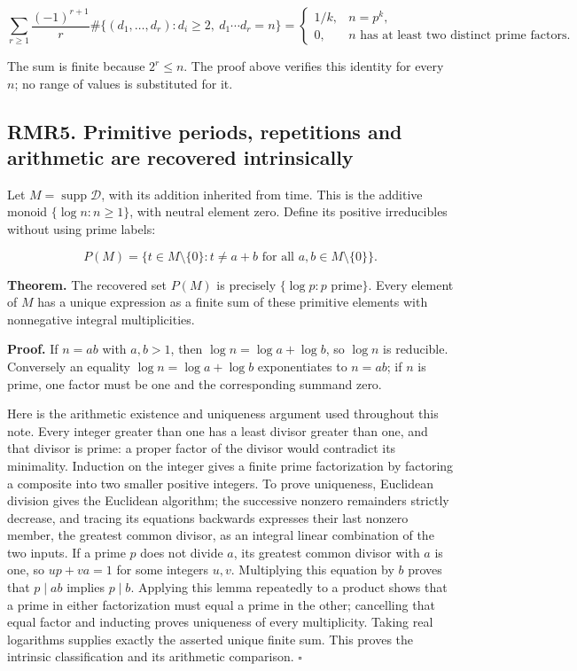 \[
\sum_{r\ge1}\frac{(-1)^{r+1}}r
\#\{(d_1,\ldots,d_r):d_i\ge2,\ d_1\cdots d_r=n\}
=\begin{cases}1/k,&n=p^k,\\0,&n\text{ has at least two distinct prime factors.}\end{cases}
\tag{RMR4.5}
\]

The sum is finite because \(2^r\le n\). The proof above verifies this
identity for every \(n\); no range of values is substituted for it.

\subsection{RMR5. Primitive periods, repetitions and arithmetic are
recovered
intrinsically}\label{rmr5.-primitive-periods-repetitions-and-arithmetic-are-recovered-intrinsically}

Let \(M=\operatorname{supp}\mathcal D\), with its addition inherited
from time. This is the additive monoid \(\{\log n:n\ge1\}\), with
neutral element zero. Define its positive irreducibles without using
prime labels:

\[
P(M)=\{t\in M\setminus\{0\}:t\ne a+b\text{ for all }a,b\in M\setminus\{0\}\}.
\tag{RMR5.1}
\]

\textbf{Theorem.} The recovered set \(P(M)\) is precisely
\(\{\log p:p\text{ prime}\}\). Every element of \(M\) has a unique
expression as a finite sum of these primitive elements with nonnegative
integral multiplicities.

\textbf{Proof.} If \(n=ab\) with \(a,b>1\), then
\(\log n=\log a+\log b\), so \(\log n\) is reducible. Conversely an
equality \(\log n=\log a+\log b\) exponentiates to \(n=ab\); if \(n\) is
prime, one factor must be one and the corresponding summand zero.

Here is the arithmetic existence and uniqueness argument used throughout
this note. Every integer greater than one has a least divisor greater
than one, and that divisor is prime: a proper factor of the divisor
would contradict its minimality. Induction on the integer gives a finite
prime factorization by factoring a composite into two smaller positive
integers. To prove uniqueness, Euclidean division gives the Euclidean
algorithm; the successive nonzero remainders strictly decrease, and
tracing its equations backwards expresses their last nonzero member, the
greatest common divisor, as an integral linear combination of the two
inputs. If a prime \(p\) does not divide \(a\), its greatest common
divisor with \(a\) is one, so \(up+va=1\) for some integers \(u,v\).
Multiplying this equation by \(b\) proves that \(p\mid ab\) implies
\(p\mid b\). Applying this lemma repeatedly to a product shows that a
prime in either factorization must equal a prime in the other;
cancelling that equal factor and inducting proves uniqueness of every
multiplicity. Taking real logarithms supplies exactly the asserted
unique finite sum. This proves the intrinsic classification and its
arithmetic comparison. \(\square\)


